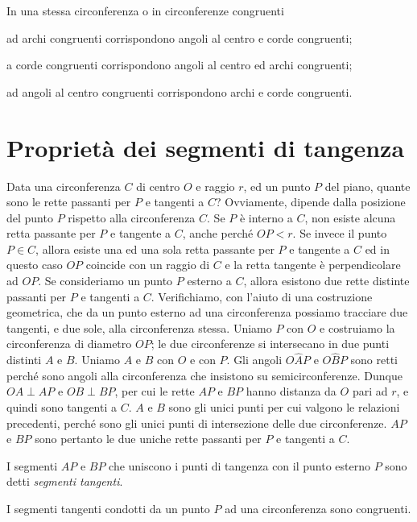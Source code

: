 \begin{teorema}
In una stessa circonferenza o in circonferenze congruenti
\begin{itemize*}
\item ad archi congruenti corrispondono angoli al centro e corde congruenti;
\item a corde congruenti corrispondono angoli al centro ed archi congruenti;
\item ad angoli al centro congruenti corrispondono archi e corde congruenti.
\end{itemize*}
\end{teorema}

\section{Proprietà dei segmenti di tangenza}

Data una circonferenza $C$ di centro $O$ e raggio $r$, ed un punto $P$ del piano, quante sono le rette passanti per $P$ e tangenti a $C$?  Ovviamente, dipende dalla posizione del punto $P$ rispetto alla circonferenza $C$. Se $P$ è interno a $C$, non esiste alcuna retta passante per $P$ e tangente a $C$, anche perché $OP < r$. Se invece il punto $P\in C$, allora esiste una ed una sola retta passante per $P$ e tangente a $C$ ed in questo caso $OP$ coincide con un raggio di $C$ e la retta tangente è perpendicolare ad $OP$.
Se consideriamo un punto $P$ esterno a $C$, allora esistono due rette distinte passanti per $P$ e tangenti a $C$. Verifichiamo, con l'aiuto di una costruzione geometrica, che da un punto esterno ad una circonferenza possiamo tracciare due tangenti, e due sole, alla circonferenza stessa.
Uniamo $P$ con $O$ e costruiamo la circonferenza di diametro $OP$; le due circonferenze si intersecano in due punti distinti $A$ e $B$. Uniamo $A$ e $B$ con $O$ e con $P$. Gli angoli $O\widehat{A}P$ e $O\widehat{B}P$ sono retti perché sono angoli alla circonferenza che insistono su semicirconferenze. Dunque $OA\perp AP$ e $OB\perp BP$, per cui le rette $AP$ e $BP$ hanno distanza da $O$ pari ad $r$, e quindi sono tangenti a $C$. $A$ e $B$ sono gli unici punti per cui valgono le relazioni precedenti, perché sono gli unici punti di intersezione delle due circonferenze. $AP$ e $BP$ sono pertanto le due uniche rette passanti per $P$ e tangenti a $C$.

I segmenti $AP$ e $BP$ che uniscono i punti di tangenza con il punto esterno $P$ sono detti \emph{segmenti tangenti}.

\begin{teorema}
I segmenti tangenti condotti da un punto $P$ ad una circonferenza sono congruenti.
\end{teorema}

